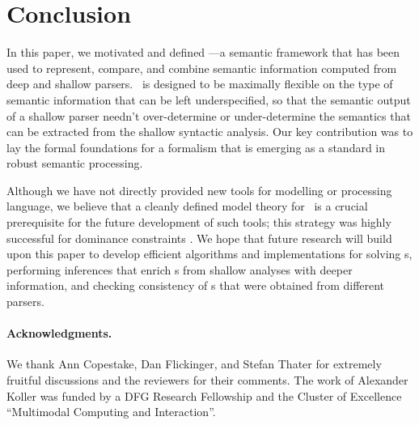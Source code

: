 \section{Conclusion}
\label{sec:conclusion}

In this paper, we motivated and defined \rmrs---a semantic framework
that has been used to represent, compare, and combine semantic
information computed from deep and shallow parsers.  \rmrs\ is
designed to be maximally flexible on the type of semantic information
that can be left underspecified, so that the semantic output of a
shallow parser needn't over-determine or under-determine the semantics
that can be extracted from the shallow syntactic analysis.  Our key
contribution was to lay the formal foundations for a formalism that is
emerging as a standard in robust semantic processing.

Although we have not directly provided new tools for modelling or
processing language, we believe that a cleanly defined model theory
for \rmrs\ is a crucial prerequisite for the future development of
such tools; this strategy was highly successful for dominance
constraints \cite{Althaus_etal:JoA}. We hope that future research will
build upon this paper to develop efficient algorithms and
implementations for solving \rmrs s, performing inferences that enrich
\rmrs s from shallow analyses with deeper information, and checking
consistency of \rmrs s that were obtained from different parsers.

\paragraph{Acknowledgments.} We thank Ann Copestake, Dan Flickinger,
and Stefan Thater for extremely fruitful discussions and the reviewers
for their comments. The work of Alexander Koller was funded by a DFG
Research Fellowship and the Cluster of Excellence ``Multimodal
Computing and Interaction''.

